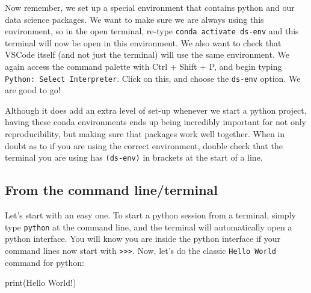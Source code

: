 \documentclass[
  letterpaper,
  DIV=11,
  numbers=noendperiod]{scrreprt}
\newenvironment{Shaded}{\begin{snugshade}}{\end{snugshade}}
\newcommand{\BuiltInTok}[1]{\textcolor[rgb]{0.00,0.23,0.31}{#1}}
\newcommand{\NormalTok}[1]{\textcolor[rgb]{0.00,0.23,0.31}{#1}}
\newcommand{\StringTok}[1]{\textcolor[rgb]{0.13,0.47,0.30}{#1}}
\begin{document}
Now remember, we set up a special environment that contains python and
our data science packages. We want to make sure we are always using this
environment, so in the open terminal, re-type
\texttt{conda\ activate\ ds-env} and this terminal will now be open in
this environment. We also want to check that VSCode itself (and not just
the terminal) will use the same environment. We again access the command
palette with Ctrl + Shift + P, and begin typing
\texttt{Python:\ Select\ Interpreter}. Click on this, and choose the
\texttt{ds-env} option. We are good to go!

\begin{tcolorbox}[enhanced jigsaw, colframe=quarto-callout-note-color-frame, toprule=.15mm, colback=white, leftrule=.75mm, rightrule=.15mm, breakable, colbacktitle=quarto-callout-note-color!10!white, arc=.35mm, bottomtitle=1mm, bottomrule=.15mm, titlerule=0mm, title=\textcolor{quarto-callout-note-color}{\faInfo}\hspace{0.5em}{Conda Environments}, toptitle=1mm, left=2mm, opacityback=0, coltitle=black, opacitybacktitle=0.6]
Although it does add an extra level of set-up whenever we start a python
project, having these conda environments ends up being incredibly
important for not only reproducibility, but making sure that packages
work well together. When in doubt as to if you are using the correct
environment, double check that the terminal you are using has
\texttt{(ds-env)} in brackets at the start of a line.
\end{tcolorbox}

\hypertarget{from-the-command-lineterminal}{%
\subsection{From the command
line/terminal}\label{from-the-command-lineterminal}}

Let's start with an easy one. To start a python session from a terminal,
simply type \texttt{python} at the command line, and the terminal will
automatically open a python interface. You will know you are inside the
python interface if your command lines now start with
\texttt{\textgreater{}\textgreater{}\textgreater{}}. Now, let's do the
classic \texttt{Hello\ World} command for python:

\begin{Shaded}
\begin{Highlighting}[]
\BuiltInTok{print}\NormalTok{(}\StringTok{\textquotesingle{}Hello World!\textquotesingle{}}\NormalTok{)}
\end{Highlighting}
\end{Shaded}
\end{document}

